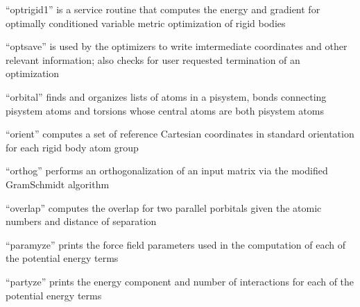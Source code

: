 \documentclass[letterpaper,11pt,english]{sphinxmanual}
\begin{document}

“optrigid1” is a service routine that computes the energy
and gradient for optimally conditioned variable metric
optimization of rigid bodies


“optsave” is used by the optimizers to write imtermediate
coordinates and other relevant information; also checks for
user requested termination of an optimization


“orbital” finds and organizes lists of atoms in a pisystem,
bonds connecting pisystem atoms and torsions whose central
atoms are both pisystem atoms


“orient” computes a set of reference Cartesian coordinates
in standard orientation for each rigid body atom group


“orthog” performs an orthogonalization of an input matrix
via the modified Gram\sphinxhyphen{}Schmidt algorithm


“overlap” computes the overlap for two parallel p\sphinxhyphen{}orbitals
given the atomic numbers and distance of separation


“paramyze” prints the force field parameters used in the
computation of each of the potential energy terms


“partyze” prints the energy component and number of
interactions for each of the potential energy terms








\end{document}
